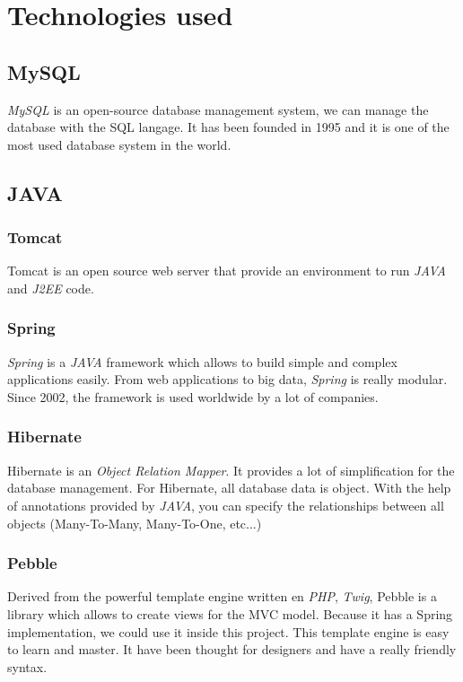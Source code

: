 \chapter{Technologies used}

\section{MySQL}

\textit{MySQL} is an open-source database management system, we can manage the database with the SQL langage.  It has been founded in 1995 and it is one of the most used database system in the world.

\section{JAVA}
\subsection{Tomcat}

Tomcat is an open source web server that provide an environment to run \textit{JAVA} and \textit{J2EE} code.

\subsection{Spring}
\textit{Spring} is a \textit{JAVA} framework which allows to build simple and complex applications easily. From web applications to big data, \textit{Spring} is really modular. Since 2002, the framework is used worldwide by a lot of companies. 


\subsection{Hibernate}
Hibernate is an \textit{Object Relation Mapper}. It provides a lot of simplification for the database management. For Hibernate, all database data is object. With the help of annotations provided by \textit{JAVA}, you can specify the relationships between all objects (Many-To-Many, Many-To-One, etc...) 


\subsection{Pebble}
Derived from the powerful template engine written en \textit{PHP}, \textit{Twig}, Pebble is a library which allows to create views for the MVC model. Because it has a Spring implementation, we could use it inside this project. This template engine is easy to learn and master. It have been thought for designers and have a really friendly syntax.

